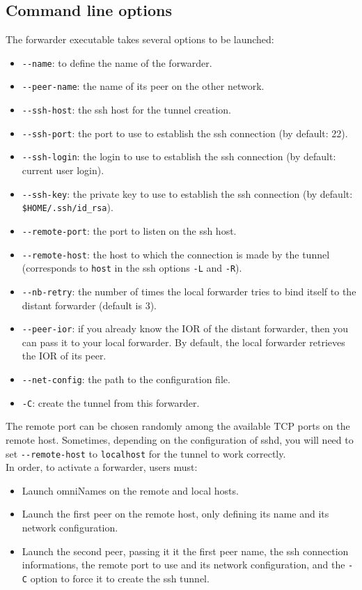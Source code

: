 \subsection{Command line options}
The \diet forwarder executable takes several options to be launched:
\begin{itemize}
\item \verb#--name#: to define the name of the forwarder.
\item \verb#--peer-name#: the name of its peer on the other network.
\item \verb#--ssh-host#: the ssh host for the tunnel creation.
\item \verb#--ssh-port#: the port to use to establish the ssh
  connection (by default: 22).
\item \verb#--ssh-login#: the login to use to establish the ssh
  connection (by default: current user login).
\item \verb#--ssh-key#: the private key to use to establish the ssh
  connection (by default: \verb#$HOME/.ssh/id_rsa#).
\item \verb#--remote-port#: the port to listen on the ssh host.
\item \verb#--remote-host#: the host to which the connection is made
  by the tunnel (corresponds to \verb#host# in the ssh options
  \verb#-L# and \verb#-R#).
\item \verb#--nb-retry#: the number of times the local forwarder tries
  to bind itself to the distant forwarder (default is 3).
\item \verb#--peer-ior#: if you already know the IOR of the distant
  forwarder, then you can pass it to your local forwarder. By default,
  the local forwarder retrieves the IOR of its peer.
\item \verb#--net-config#: the path to the configuration file.
\item \verb#-C#: create the tunnel from this forwarder.
\end{itemize}
The remote port can be chosen randomly among the available TCP ports
on the remote host. Sometimes, depending on the configuration of sshd,
you will need to set \verb#--remote-host# to \verb#localhost# for the
tunnel to work correctly.\\

\noindent In order, to activate a \diet forwarder, users must:
\begin{itemize}
\item Launch omniNames on the remote and local hosts.
\item Launch the first peer on the remote host, only defining its name
  and its network configuration.
\item Launch the second peer, passing it it the first peer name, the
  ssh connection informations, the remote port to use and its network
  configuration, and the \verb#-C# option to force it to create the
  ssh tunnel.
\end{itemize}


